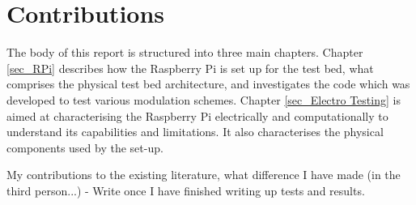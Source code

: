\documentclass[../main.tex]{subfiles}
\begin{document}
\section{Contributions}

The body of this report is structured into three main chapters.
Chapter \ref{sec_RPi} describes how the Raspberry Pi is set up for the test bed, what comprises the physical test bed architecture,  and investigates the code which was developed to test various modulation schemes.
Chapter \ref{sec_Electro Testing} is aimed at characterising the Raspberry Pi electrically and computationally to understand its capabilities and limitations.
It also characterises the physical components used by the set-up.

My contributions to the existing literature, what difference I have made (in the third person...) - Write once I have finished writing up tests and results.
\end{document}
